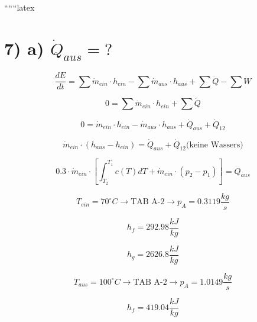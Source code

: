 
``````latex


\section*{7) a) $\dot{Q}_{aus} = ?$}

\begin{equation*}
\frac{dE}{dt} = \sum \dot{m}_{ein} \cdot h_{ein} - \sum \dot{m}_{aus} \cdot h_{aus} + \sum \dot{Q} - \sum \dot{W}
\end{equation*}


\begin{equation*}
0 = \sum \dot{m}_{ein} \cdot h_{ein} + \sum \dot{Q}
\end{equation*}

\begin{equation*}
0 = \dot{m}_{ein} \cdot h_{ein} - \dot{m}_{aus} \cdot h_{aus} + \dot{Q}_{aus} + \dot{Q}_{12}
\end{equation*}

\begin{equation*}
\dot{m}_{ein} \cdot (h_{aus} - h_{ein}) = \dot{Q}_{aus} + \dot{Q}_{12} \text{(keine Wassers)}
\end{equation*}

\begin{equation*}
0.3 \cdot \dot{m}_{ein} \cdot \left[ \int_{T_2}^{T_1} c(T) dT + \dot{m}_{ein} \cdot (p_2 - p_1) \right] = \dot{Q}_{aus}
\end{equation*}


\begin{equation*}
T_{ein} = 70^\circ C \rightarrow \text{TAB A-2} \rightarrow p_A = 0.3119 \frac{kg}{s}
\end{equation*}

\begin{equation*}
h_f = 292.98 \frac{kJ}{kg}
\end{equation*}

\begin{equation*}
h_g = 2626.8 \frac{kJ}{kg}
\end{equation*}

\begin{equation*}
T_{aus} = 100^\circ C \rightarrow \text{TAB A-2} \rightarrow p_A = 1.0149 \frac{kg}{s}
\end{equation*}

\begin{equation*}
h_f = 419.04 \frac{kJ}{kg}
\end{equation*}

